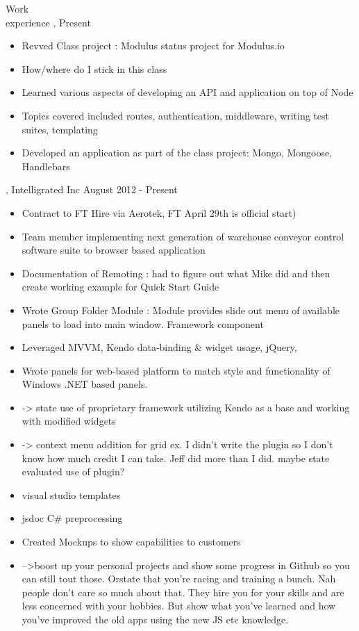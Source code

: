 \begin{category}{Work \\experience}
, Present
\begin{itemize}
\item Revved Class project : Modulus status project for Modulus.io 
\item How/where do I stick in this class
\item Learned various aspects of developing an API and application on top of Node
\item Topics covered included routes, authentication, middleware, writing test suites, templating
\item Developed an application as part of the class project: Mongo, Mongoose, Handlebars
\end{itemize}

, Intelligrated Inc  August 2012 - Present
\begin{itemize}
\item Contract to FT Hire via Aerotek, FT April 29th is official start)
\item Team member implementing next generation of warehouse conveyor control software suite to browser based application 
\item Documentation of Remoting : had to figure out what Mike did and then create working example for Quick Start Guide
\item
Wrote Group Folder Module : Module provides slide out menu of available panels to load into main window. Framework component
\item 
Leveraged MVVM, Kendo data-binding & widget usage, jQuery, 
\item
Wrote panels for web-based platform to match style and functionality of Windows .NET based panels. 
\item
-> state use of proprietary framework utilizing Kendo as a base and working with modified widgets
\item
-> context menu addition for grid ex. I didn't write the plugin so I don't know how much credit I can take. Jeff did more than I did. maybe state evaluated use of plugin?
\item visual studio templates
\item jsdoc C# preprocessing
\item Created Mockups to show capabilities to customers
\item 
-->boost up your personal projects and show some progress in Github so you can still tout those. Orstate that you're racing and training a bunch. 
Nah people don't care so much about that. They hire you for your skills and are less concerned with your hobbies.
But show what you've learned and how you've improved the old apps using the new JS etc knowledge.



\end{itemize}
\end{category}
